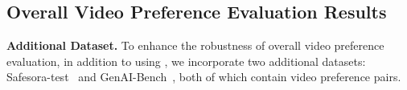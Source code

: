  





\subsection{Overall Video Preference Evaluation Results}\label{sec:overall_evaluation}


\textbf{Additional Dataset.} To enhance the robustness of overall video preference evaluation, in addition to using \datasetname, we incorporate two additional datasets: Safesora-test~\citep{dai2024safesorasafetyalignmenttext2video} and GenAI-Bench~\citep{jiang2024genai}, both of which contain video preference pairs.






